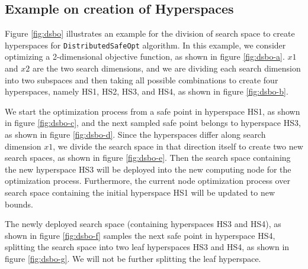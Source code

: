 \clearpage
\subsection{Example on creation of Hyperspaces}
\label{subsec:dsbo-example}
Figure \ref{fig:dsbo} illustrates an example for the division of search space to create hyperspaces for \texttt{DistributedSafeOpt} algorithm. In this example, we consider optimizing a 2-dimensional objective function, as shown in figure \ref{fig:dsbo-a}. $x1$ and $x2$ are the two search dimensions, and we are dividing each search dimension into two subspaces and then taking all possible combinations to create four hyperspaces, namely HS1, HS2, HS3, and HS4, as shown in figure \ref{fig:dsbo-b}. 

We start the optimization process from a safe point in hyperspace HS1, as shown in figure \ref{fig:dsbo-c}, and the next sampled safe point belongs to hyperspace HS3, as shown in figure \ref{fig:dsbo-d}. Since the hyperspaces differ along search dimension $x1$, we divide the search space in that direction itself to create two new search spaces, as shown in figure \ref{fig:dsbo-e}. Then the search space containing the new hyperspace HS3 will be deployed into the new computing node for the optimization process.
Furthermore, the current node optimization process over search space containing the initial hyperspace HS1 will be updated to new bounds. 

The newly deployed search space (containing hyperspaces HS3 and HS4), as shown in figure \ref{fig:dsbo-f} samples the next safe point in hyperspace HS4, splitting the search space into two leaf hyperspaces HS3 and HS4, as shown in figure \ref{fig:dsbo-g}. We will not be further splitting the leaf hyperspace.

